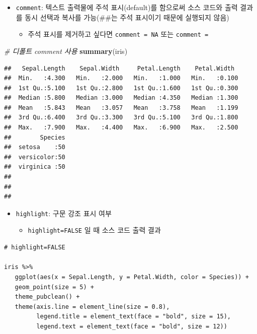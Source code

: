 \documentclass[
  11pt,
]{krantz}
\newenvironment{Shaded}{\begin{snugshade}}{\end{snugshade}}
\newcommand{\CommentTok}[1]{\textcolor[rgb]{0.37,0.37,0.37}{\textit{#1}}}
\newcommand{\KeywordTok}[1]{\textcolor[rgb]{0.27,0.27,0.27}{\textbf{#1}}}
\newcommand{\NormalTok}[1]{#1}
\providecommand{\tightlist}{%
  \setlength{\itemsep}{0pt}\setlength{\parskip}{0pt}}
\begin{document}
\normalsize

\begin{itemize}
\tightlist
\item
  \texttt{comment}: 텍스트 출력물에 주석 표시(default)를 함으로써 소스 코드와 출력 결과를 동시 선택과 복사를 가능(\#\#는 주석 표시이기 때문에 실행되지 않음)

  \begin{itemize}
  \tightlist
  \item
    주석 표시를 제거하고 싶다면 \texttt{comment\ =\ NA} 또는 \texttt{comment\ =\ \textquotesingle{}\textquotesingle{}}
  \end{itemize}
\end{itemize}

\footnotesize

\begin{Shaded}
\begin{Highlighting}[]
\CommentTok{# 디폴트 comment 사용}
\KeywordTok{summary}\NormalTok{(iris)}
\end{Highlighting}
\end{Shaded}

\begin{verbatim}
##   Sepal.Length    Sepal.Width     Petal.Length    Petal.Width   
##  Min.   :4.300   Min.   :2.000   Min.   :1.000   Min.   :0.100  
##  1st Qu.:5.100   1st Qu.:2.800   1st Qu.:1.600   1st Qu.:0.300  
##  Median :5.800   Median :3.000   Median :4.350   Median :1.300  
##  Mean   :5.843   Mean   :3.057   Mean   :3.758   Mean   :1.199  
##  3rd Qu.:6.400   3rd Qu.:3.300   3rd Qu.:5.100   3rd Qu.:1.800  
##  Max.   :7.900   Max.   :4.400   Max.   :6.900   Max.   :2.500  
##        Species  
##  setosa    :50  
##  versicolor:50  
##  virginica :50  
##                 
##                 
## 
\end{verbatim}

\normalsize

\begin{itemize}
\tightlist
\item
  \texttt{highlight}: 구문 강조 표시 여부

  \begin{itemize}
  \tightlist
  \item
    \texttt{highlight=FALSE} 일 때 소스 코드 출력 결과
  \end{itemize}
\end{itemize}

\footnotesize

\begin{verbatim}
# highlight=FALSE

iris %>%
   ggplot(aes(x = Sepal.Length, y = Petal.Width, color = Species)) +
   geom_point(size = 5) +
   theme_pubclean() +
   theme(axis.line = element_line(size = 0.8),
         legend.title = element_text(face = "bold", size = 15),
         legend.text = element_text(face = "bold", size = 12))
\end{verbatim}
\end{document}
